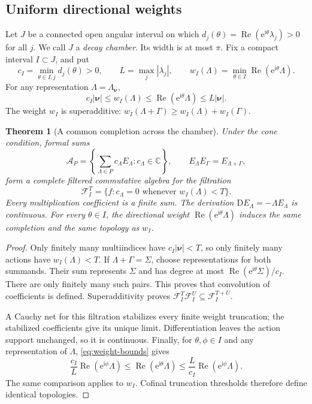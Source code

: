 \documentclass[11pt,a4paper]{article}
\numberwithin{equation}{section}
\newtheorem{theorem}{Theorem}[section]
\theoremstyle{definition}
\theoremstyle{remark}
\newcommand{\C}{\mathbb C}
\newcommand{\D}{\mathrm D}
\newcommand{\ii}{\mathrm i}
\newcommand{\e}{\mathrm e}
\newcommand{\Rea}{\operatorname{Re}}
\newcommand{\nn}{\boldsymbol\nu}
\begin{document}
\subsection{Uniform directional weights}

Let $J$ be a connected open angular interval on which
$d_j(\theta)=\Rea(\e^{\ii\theta}\lambda_j)>0$ for all $j$. We call $J$ a
\emph{decay chamber}. Its width is at most $\pi$. Fix a compact interval
$I\subset J$, and put
\begin{equation}\label{eq:weight-constants}
 c_I=\min_{\theta\in I,j}d_j(\theta)>0,
 \qquad L=\max_j|\lambda_j|,
 \qquad w_I(\Lambda)=\min_{\theta\in I}\Rea(\e^{\ii\theta}\Lambda).
\end{equation}
For any representation $\Lambda=\Lambda_{\nn}$,
\begin{equation}\label{eq:weight-bounds}
 c_I|\nn|\le w_I(\Lambda)
 \le\Rea(\e^{\ii\theta}\Lambda)\le L|\nn|.
\end{equation}
The weight $w_I$ is superadditive:
$w_I(\Lambda+\Gamma)\ge w_I(\Lambda)+w_I(\Gamma)$.

\begin{theorem}[A common completion across the chamber]\label{thm:completion}
Under the cone condition, formal sums
\[
 \mathcal A_P=\left\{\sum_{\Lambda\in P}c_\Lambda E_\Lambda:
 c_\Lambda\in\C\right\},\qquad
 E_\Lambda E_\Gamma=E_{\Lambda+\Gamma},
\]
form a complete filtered commutative algebra for the filtration
\[
 \mathcal F_I^T=\{f:c_\Lambda=0\text{ whenever }w_I(\Lambda)<T\}.
\]
Every multiplication coefficient is a finite sum. The derivation
$\D E_\Lambda=-\Lambda E_\Lambda$ is continuous. For every $\theta\in I$,
the directional weight $\Rea(\e^{\ii\theta}\Lambda)$ induces the same
completion and the same topology as $w_I$.
\end{theorem}

\begin{proof}
Only finitely many multiindices have $c_I|\nn|<T$, so only finitely many
actions have $w_I(\Lambda)<T$. If $\Lambda+\Gamma=\Sigma$, choose
representations for both summands. Their sum represents $\Sigma$ and has
degree at most $\Rea(\e^{\ii\theta}\Sigma)/c_I$. There are only finitely
many such pairs. This proves that convolution of coefficients is defined.
Superadditivity proves
$\mathcal F_I^T\mathcal F_I^U\subseteq\mathcal F_I^{T+U}$.

A Cauchy net for this filtration stabilizes every finite weight truncation;
the stabilized coefficients give its unique limit. Differentiation leaves
the action support unchanged, so it is continuous. Finally, for
$\theta,\phi\in I$ and any representation of $\Lambda$, \eqref{eq:weight-bounds}
gives
\begin{equation}\label{eq:equivalent-directions}
 \frac{c_I}{L}\Rea(\e^{\ii\phi}\Lambda)
 \le\Rea(\e^{\ii\theta}\Lambda)
 \le\frac{L}{c_I}\Rea(\e^{\ii\phi}\Lambda).
\end{equation}
The same comparison applies to $w_I$. Cofinal truncation thresholds therefore
define identical topologies.
\end{proof}
\end{document}
